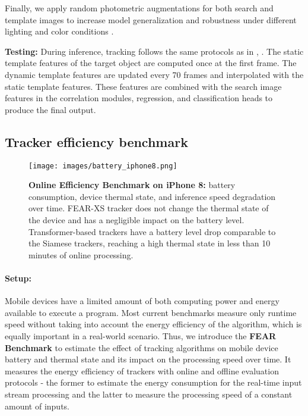 \documentclass[runningheads]{llncs}
\begin{document}
Finally, we apply random photometric augmentations for both search and template images to increase model generalization and robustness under different lighting and color conditions \cite{albumentations}.

\textbf{Testing:} During inference, tracking follows the same protocols as in \cite{SiamFC}, \cite{SiamRPN}. 
The static template features of the target object are computed once at the first frame. 
The dynamic template features are updated every 70 frames and interpolated with the static template features. 
These features are combined with the search image features in the correlation modules, regression, and classification heads to produce the final output. 









\subsection{Tracker efficiency benchmark} 

\begin{figure}[t!]\centering
\texttt{[image: images/battery\_iphone8.png]}
\caption{\textbf{Online Efficiency Benchmark on iPhone 8:} battery consumption, device thermal state, and inference speed degradation over time. FEAR-XS tracker does not change the thermal state of the device and has a negligible impact on the battery level. Transformer-based trackers have a battery level drop comparable to the Siamese trackers, reaching a high thermal state in less than 10 minutes of online processing.}
\label{fig:battery-online}
\end{figure}

\paragraph{Setup:} Mobile devices have a limited amount of both computing power and energy available to execute a program. Most current benchmarks measure only runtime speed without taking into account the energy efficiency of the algorithm, which is equally important in a real-world scenario. Thus, we introduce the \textbf{FEAR Benchmark} to estimate the effect of tracking algorithms on mobile device battery and thermal state and its impact on the processing speed over time. It measures the energy efficiency of trackers with online and offline evaluation protocols - the former to estimate the energy consumption for the real-time input stream processing and the latter to measure the processing speed of a constant amount of inputs.
\end{document}
